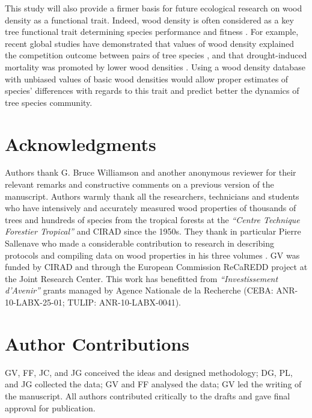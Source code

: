 \documentclass[a4paper, 12pt, leqno, dvipsnames]{article}\usepackage[]{graphicx}\usepackage[]{color}
\begin{document}
This study will also provide a firmer basis for future ecological research on wood density as a functional trait. Indeed, wood density is often considered as a key tree functional trait determining species performance and fitness \citep{Chave2009, Baraloto2010, Kunstler2016, Diaz2016, Greenwood2017}. For example, recent global studies have demonstrated that values of wood density explained the competition outcome between pairs of tree species \citep{Kunstler2016}, and that drought-induced mortality was promoted by lower wood densities \citep{Greenwood2017}. Using a wood density database with unbiased values of basic wood densities would allow proper estimates of species' differences with regards to this trait and predict better the dynamics of tree species community.

\newpage

\section*{Acknowledgments}

Authors thank G. Bruce Williamson and another anonymous reviewer for their relevant remarks and constructive comments on a previous version of the manuscript. Authors warmly thank all the researchers, technicians and students who have intensively and accurately measured wood properties of thousands of trees and hundreds of species from the tropical forests at the \emph{``Centre Technique Forestier Tropical''} and CIRAD since the 1950s. They thank in particular Pierre Sallenave who made a considerable contribution to research in describing protocols and compiling data on wood properties in his three volumes \citep{Sallenave1955, Sallenave1964, Sallenave1971}. GV was funded by CIRAD and through the European Commission ReCaREDD project at the Joint Research Center. This work has benefitted from \emph{``Investissement d'Avenir''} grants managed by Agence Nationale de la Recherche (CEBA: ANR-10-LABX-25-01; TULIP: ANR-10-LABX-0041).

\section*{Author Contributions}

GV, FF, JC, and JG conceived the ideas and designed methodology; DG, PL, and JG collected the data; GV and FF analysed the data; GV led the writing of the manuscript. All authors contributed critically to the drafts and gave final approval for publication.
\end{document}
